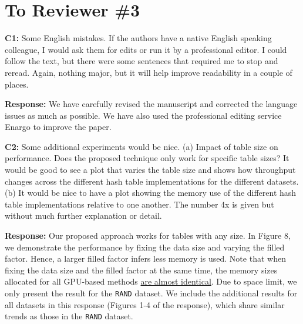 \section*{To Reviewer \#3}

\begin{shaded}
	\noindent\textbf{C1:} Some English mistakes.  If the authors have a native English speaking colleague, I would ask them for edits or run it by a professional editor.  I could follow the text, but there were some sentences that required me to stop and reread.  Again, nothing major, but it will help improve readability in a couple of places.
\end{shaded}
%
\noindent\textbf{Response:} 
We have carefully revised the manuscript and corrected the language issues as much as possible. We have also used the professional editing service Enargo to improve the paper. 

\begin{shaded}
	\noindent\textbf{C2:} Some additional experiments would be nice.
	(a) Impact of table size on performance.  Does the proposed technique only work for specific table sizes?  It would be good to see a plot that varies the table size and shows how throughput changes across the different hash table implementations for the different datasets.
	(b) It would be nice to have a plot showing the memory use of the different hash table implementations relative to one another.  The number 4x is given but without much further explanation or detail.
\end{shaded}
%
\noindent\textbf{Response:} 
Our proposed approach works for tables with any size. 
In Figure 8, we demonstrate the performance by fixing the data size and varying the filled factor. 
Hence, a larger filled factor infers less memory is used.
Note that when fixing the data size and the filled factor at the same time, the memory sizes allocated for all GPU-based methods \underline{are almost identical}.  
Due to space limit, we only present the result for the {\tt RAND} dataset.
We include the additional results for all datasets in this response (Figures 1-4 of the response), which share similar trends as those in the {\tt RAND} dataset.

